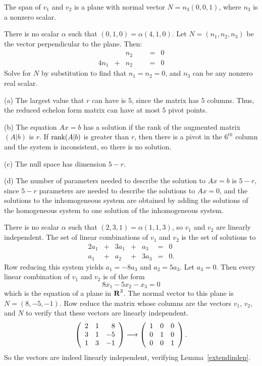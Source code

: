  \ans The span of $v_1$ and $v_2$ is a plane with normal
vector $N = n_3(0,0,1)$, where $n_3$ is a nonzero scalar.

\soln There is no scalar $\alpha$ such that $(0,1,0) = \alpha(4,1,0)$. 
Let $N = (n_1,n_2,n_3)$ be the vector perpendicular to the plane.  Then:
\[
\begin{array}{rrrrrcl}
& & n_2 & & & = & 0 \\
4n_1 & + & n_2 & & & = & 0 \end{array}
\]
Solve for $N$ by substitution to find that $n_1 = n_2 = 0$, and
$n_3$ can be any nonzero real scalar.

(a) The largest value that $r$ can have is $5$, since the matrix has
$5$ columns.  Thus, the reduced echelon form matrix can have at most
$5$ pivot points.

(b) The equation $Ax = b$ has a solution if the rank of the augmented
matrix $(A|b)$ is $r$.  If ${\rm rank} (A|b)$ is greater than $r$, then
there is a pivot in the $6^{th}$ column and the system is
inconsistent, so there is no solution.

(c) The null space has dimension $5 - r$.

(d) The number of parameters needed to describe the solution to
$Ax = b$ is $5 - r$, since $5 - r$ parameters are needed to describe
the solutions to $Ax = 0$, and the solutions to the inhomogeneous
system are obtained by adding the solutions of the homogeneous system
to one solution of the inhomogeneous system.

There is no scalar $\alpha$ such that $(2,3,1) = \alpha(1,1,3)$, so
$v_1$ and $v_2$ are linearly independent.
The set of linear combinations of $v_1$ and $v_2$ is the set of
solutions to
\[
\begin{array}{rrrrrrl}
2a_1 & + & 3a_1 & + & a_3 & = & 0 \\
a_1 & + & a_2 & + & 3a_3 & = & 0. \end{array}
\]
Row reducing this system yields $a_1 = -8a_3$ and $a_2 = 5a_3$.
Let $a_3 = 0$.  Then every linear combination of $v_1$ and $v_2$ is
of the form
\[
8x_1 - 5x_2 - x_3 = 0
\]
which is the equation of a plane in $\mbox{$\bf{R}$}^3$.  The normal vector to this
plane is $N = (8,-5,-1)$.  Row reduce the matrix whose columns
are the vectors $v_1$, $v_2$, and $N$ to verify that these vectors
are linearly independent.
\[
\left(\begin{array}{rrr} 2 & 1 & 8 \\ 3 & 1 & -5 \\ 1 & 3 & -1\end{array}\right) \longrightarrow
\left(\begin{array}{rrr} 1 & 0 & 0 \\ 0 & 1 & 0 \\ 0 & 0 & 1\end{array}\right).
\]
So the vectors are indeed linearly independent, verifying
Lemma~\ref{extendindep}.

